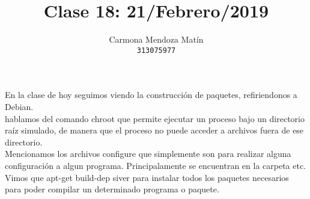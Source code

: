 \documentclass[11pt, a4paper]{report}
\begin{document}
\title{Clase 18: 21/Febrero/2019}
\author{
  Carmona Mendoza Mat\'in\\
  \texttt{313075977}
}
\date{}
\maketitle

En la clase de hoy seguimos viendo la construcción de paquetes, refiriendonos
a Debian. \\

hablamos del comando chroot que permite ejecutar un proceso bajo un directorio
raíz simulado, de manera que el proceso no puede acceder a archivos fuera de
ese directorio. \\

Mencionamos los archivos configure que simplemente son para realizar alguna
configuración a algun programa. Principalamente se encuentran en la carpeta
etc. \\

Vimos que apt-get build-dep siver para instalar todos los paquetes necesarios
para poder compilar un determinado programa o paquete.
\end{document}
